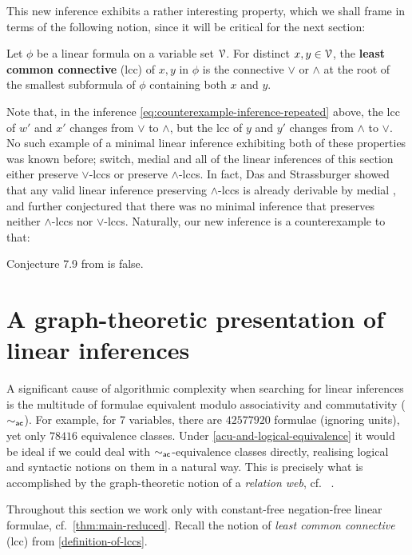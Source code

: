 \documentclass[a4paper, UKenglish, cleveref]{lipics-v2019}
\begin{document}
This new inference exhibits a rather interesting property, which we shall frame in terms of the following notion, since it will be critical for the next section:
\begin{definition}
\label{definition-of-lccs}
Let $\phi$ be a linear formula on a variable set $\mathcal{V}$. For distinct $x,y \in \mathcal{V}$, the \textbf{least common connective} (lcc) of $x,y $ in $\phi$ is the connective $\lor$ or $\land$ at the root of the smallest subformula of $\phi$ containing both $x$ and $y$.
\end{definition}
Note that, in the inference \eqref{eq:counterexample-inference-repeated} above, the lcc of $w' $ and $x'$ changes from $\lor$ to $\land$, but the lcc of $y$ and $y'$ changes from $\land$ to $\lor$.
No such example of a minimal linear inference exhibiting both of these properties was known before; switch, medial and all of the linear inferences of this section either preserve $\lor$-lccs or preserve $\land$-lccs.
In fact, Das and Strassburger showed that any valid linear inference preserving $\land$-lccs is already derivable by medial \cite[Theorem 7.5]{DasStr16:no-compl-lin-sys}, and further conjectured that there was no minimal inference that preserves neither $\land$-lccs nor $\lor$-lccs.
Naturally, our new inference is a counterexample to that:

\begin{theorem}
Conjecture 7.9 from \cite{DasStr16:no-compl-lin-sys} is false.
\end{theorem}


\section{A graph-theoretic presentation of linear inferences}
\label{sec:webs}
A significant cause of algorithmic complexity when searching for linear inferences is the multitude of formulae equivalent modulo associativity and commutativity ($\sim_{\mathsf{ac}}$). For example, for 7 variables, there are \(42577920\) formulae (ignoring units), yet only \(78416\) equivalence classes.
Under \cref{acu-and-logical-equivalence} it would be ideal if we could deal with $\sim_{\mathsf{ac}}$-equivalence classes directly, realising logical and syntactic notions on them in a natural way.
This is precisely what is accomplished by the graph-theoretic notion of a \emph{relation web}, cf.~ \cite{Gug07:sys-int-struct,Str07:char-med,DasStr15:no-comp-lin-sys,DasStr16:no-compl-lin-sys}.

Throughout this section we work only with constant-free negation-free linear formulae, cf.~\cref{thm:main-reduced}.
Recall the notion of \emph{least common connective} (lcc) from \cref{definition-of-lccs}.
\end{document}

